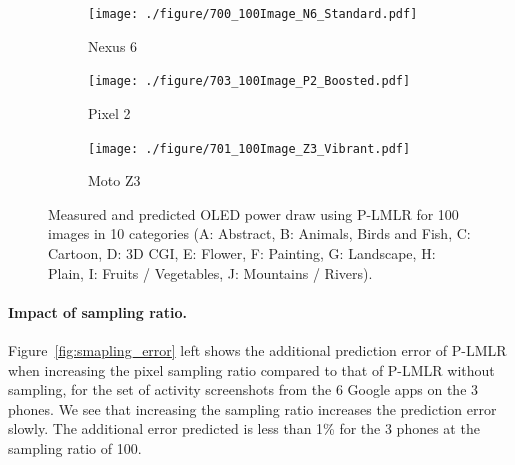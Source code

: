 \begin{figure}[th]
	\begin{subfigure}[]{0.29\textwidth}
		\texttt{[image: ./figure/700\_100Image\_N6\_Standard.pdf]}
		\caption{Nexus 6}
	\end{subfigure}
	\hfill
	\begin{subfigure}[]{0.29\textwidth}
		\texttt{[image: ./figure/703\_100Image\_P2\_Boosted.pdf]}
		\caption{Pixel 2}
	\end{subfigure}
	\hfill
	\begin{subfigure}[]{0.29\textwidth}
		\texttt{[image: ./figure/701\_100Image\_Z3\_Vibrant.pdf]}
		\caption{Moto Z3}
	\end{subfigure}
        \vspace{-0.1in}
	\caption{Measured and predicted OLED power draw using P-LMLR
          for 100 images in 10 categories (A: Abstract, B: Animals, Birds and Fish,
			C: Cartoon, D: 3D CGI, E: Flower, F: Painting, G: Landscape, H: Plain,
			I: Fruits / Vegetables, J: Mountains / Rivers).}
	\label{fig:100_images_expriment}
\end{figure}
\fi


\paragraph{Impact of sampling ratio.}
Figure~\ref{fig:smapling_error} left shows the additional
prediction error of P-LMLR when increasing the pixel sampling ratio
compared to that of P-LMLR without sampling,
for the set of activity screenshots from the 6 Google apps on the 3 phones.
We see that increasing the sampling ratio increases the prediction error
slowly. The additional error predicted is less than 1\% for the
3 phones at the sampling ratio of 100.

% 	

